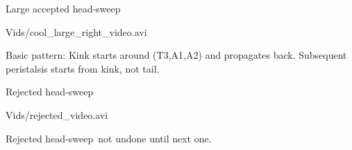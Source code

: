 \documentclass{beamer}%
\newcommand{\hs}{head-sweep}
\begin{document}

\begin{frame}{Large accepted \hs}
%
 \begin{center}
   {Vids/cool_large_right_video.avi}
 \end{center}

 Basic pattern: Kink starts around (T3,A1,A2) and propagates back.
 Subsequent peristalsis starts from kink, \alert{not} tail.
%
\end{frame}


\begin{frame}{Rejected \hs}
%
 \begin{center}
   {Vids/rejected_video.avi}
 \end{center}
 Rejected \hs\ not undone until next one.
%
\end{frame}
\end{document}
